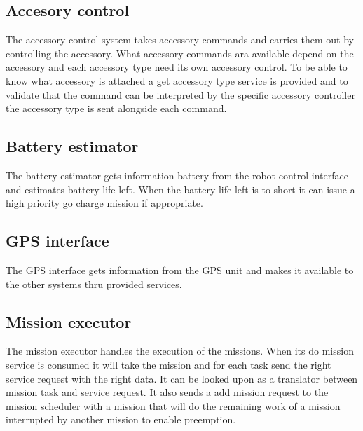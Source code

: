 \documentclass{article}
\begin{document}
\subsection{Accesory control}
\label{sec:software:first}
The accessory control system takes accessory commands and carries them out by controlling the accessory.
What accessory commands ara available depend on the accessory and each accessory type need its own accessory control.
To be able to know what accessory is attached a get accessory type service is provided and to validate that the command can be interpreted by the specific accessory controller the accessory type is sent alongside each command.

\subsection{Battery estimator}
The battery estimator gets information battery from the robot control interface and estimates battery life left.
When the battery life left is to short it can issue a high priority go charge mission if appropriate.

\subsection{GPS interface}
The GPS interface gets information from the GPS unit and makes it available to the other systems thru provided services.

\subsection{Mission executor}
The mission executor handles the execution of the missions. When its do mission service is consumed it will take the mission and for each task send the right service request with the right data. It can be looked upon as a translator between mission task and service request.
It also sends a add mission request to the mission scheduler with a mission that will do the remaining work of a mission interrupted by another mission to enable preemption.
\end{document}
